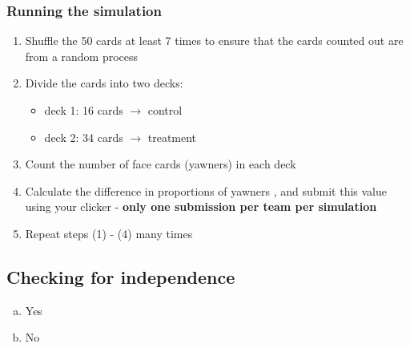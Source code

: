 \documentclass[11pt,containsverbatim,handout,xcolor=xelatex,dvipsnames,table]{beamer}
\begin{document}

\begin{frame}
\frametitle{Running the simulation}

\begin{enumerate}

\item Shuffle the 50 cards at least 7 times to ensure that the cards counted out are from a random process

\item Divide the cards into two decks:
\begin{itemize}
\item deck 1: 16 cards $\rightarrow$ control
\item deck 2: 34 cards $\rightarrow$ treatment
\end{itemize}

\item Count the number of face cards (yawners) in each deck

\item Calculate the difference in proportions of yawners , and submit this value using your clicker - \textbf{only one submission per team per simulation}

\item Repeat steps (1) - (4) many times

\end{enumerate}

\vfill


\end{frame}


\subsection{Checking for independence}

\begin{frame}


\begin{multicols}{2}
\begin{enumerate}[(a)]
\item Yes
\item No
\end{enumerate}
\end{multicols}

\end{frame}
\end{document}
